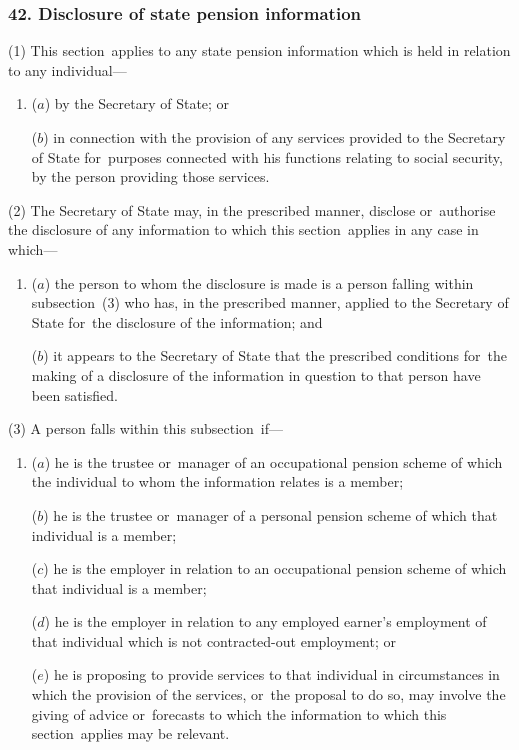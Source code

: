\documentclass[12pt,a4paper]{article}
\begin{document}
\subsubsection{42. Disclosure of state pension information}

(1) This section~applies to any state pension information which is held in relation to any individual—
\begin{enumerate}\item[]
($a$) by the Secretary of State; or

($b$) in connection with the provision of any services provided to the Secretary of State for~purposes connected with his functions relating to social security, by the person providing those services.
\end{enumerate}

(2) 
The Secretary of State may, in the prescribed manner, disclose or~authorise the disclosure of any information  %
to which this section~applies in any case in which—
\begin{enumerate}\item[]
($a$) the person to whom the disclosure is made is a person falling within subsection~(3)  who has, in the prescribed manner, applied to the Secretary of State for~the disclosure of the information; and

($b$) it appears to the Secretary of State that the prescribed conditions for~the making of a disclosure of the information in question to that person have been satisfied.
\end{enumerate}

(3) A person falls within this subsection~if—
\begin{enumerate}\item[]
($a$) he is the trustee or~manager of an occupational pension scheme of which the individual to whom the information relates is a member;

($b$) he is the trustee or~manager of a personal pension scheme of which that individual is a member;

($c$) he is the employer in relation to an occupational pension scheme of which that individual is a member;

($d$) he is the employer in relation to any employed earner’s employment of that individual which is not contracted-out employment; or

($e$) he is proposing to provide services to that individual in circumstances in which the provision of the services, or~the proposal to do so, may involve the giving of advice or~forecasts to which the information to which this section~applies may be relevant.
\end{enumerate}
\end{document}
